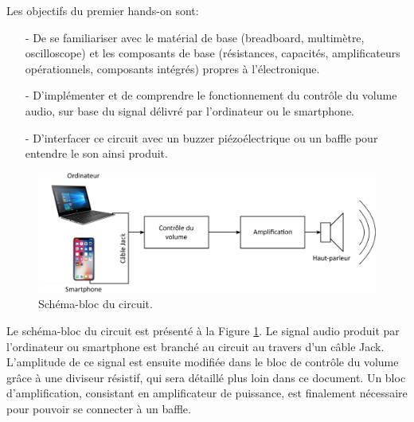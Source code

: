 Les objectifs du premier hands-on sont:
\begin{itemize}
	\item[-] De se familiariser avec le matérial de base (breadboard, multimètre, oscilloscope) et les composants de base (résistances, capacités, amplificateurs opérationnels, composants intégrés) propres à l'électronique.
	\item[-] D'implémenter et de comprendre le fonctionnement du contrôle du volume audio, sur base du signal délivré par l'ordinateur ou le smartphone.
	\item[-] D'interfacer ce circuit avec un buzzer piézoélectrique ou un baffle pour entendre le son ainsi produit.
\end{itemize}

\begin{figure}[!ht]
	\centering
	\includegraphics[width=.75\textwidth]{figures/block-diagram.eps}
	\caption{Schéma-bloc du circuit.}
	\label{fig:block-diagram}
\end{figure}

Le schéma-bloc du circuit est présenté à la Figure \ref{fig:block-diagram}. Le signal audio produit par l'ordinateur ou smartphone est branché au circuit au travers d'un câble Jack. L'amplitude de ce signal est ensuite modifiée dans le bloc de contrôle du volume grâce à une diviseur résistif, qui sera détaillé plus loin dans ce document. Un bloc d'amplification, consistant en amplificateur de puissance, est finalement nécessaire pour pouvoir se connecter à un baffle.